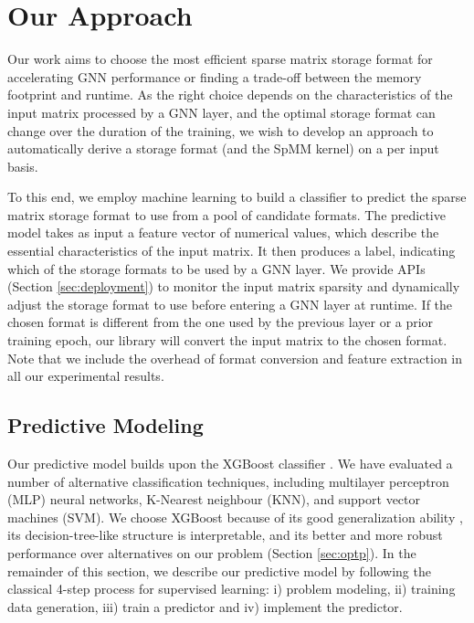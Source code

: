 \vspace{-4mm}
\section{Our Approach}
\vspace{-4mm} Our work aims to choose the most efficient sparse matrix storage format for accelerating GNN performance or finding a
trade-off between the memory footprint and runtime. As the right choice depends on the characteristics of the input matrix processed by a
GNN layer, and the optimal storage format can change over the duration of the training, we wish to develop an approach to automatically
derive a storage format (and the SpMM kernel) on a per input basis.

To this end, we employ machine learning to build a classifier to predict the sparse matrix storage format to use from a pool of candidate
formats. The predictive model takes as input a feature vector of numerical values, which describe the essential characteristics of the
input matrix. It then produces a label, indicating which of the storage formats to be used by a GNN layer. We provide APIs (Section \ref{sec:deployment}) to monitor the input matrix sparsity and dynamically adjust the storage format to use before entering a GNN layer at runtime. If the chosen format is
different from the one used by the previous layer or a prior training epoch, our library will convert the input matrix to the chosen format. Note that we include the overhead of format conversion and feature extraction in all our experimental results.

\vspace{-2mm}
\subsection{Predictive Modeling}
\vspace{-2mm}
Our predictive model builds upon the XGBoost classifier \cite{chen2015xgboost}. We have evaluated a number of alternative classification
techniques, including multilayer perceptron (MLP) neural networks, K-Nearest neighbour (KNN), and support vector machines (SVM).  We
choose XGBoost because of its good generalization ability \cite{chen2015xgboost}, its decision-tree-like structure is interpretable, and
its better and more robust performance over alternatives on our problem (Section \ref{sec:optp}). In the remainder of this section, we describe our predictive model by following the classical 4-step process for supervised
learning: i) problem modeling, ii) training  data generation, iii) train a predictor and iv) implement the predictor.

